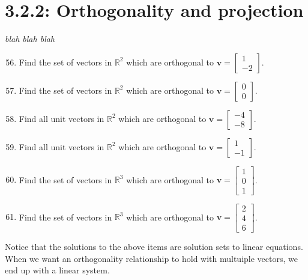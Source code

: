 \documentclass{article}
\begin{document}
\section*{3.2.2: Orthogonality and projection}
\textit{blah blah blah} 
\begin{enumerate}
    \setcounter{enumi}{55}
    \item Find the set of vectors in \(\mathbb{R}^2\) which are orthogonal to \(\mathbf{v} = \begin{bmatrix} 1 \\-2 \end{bmatrix}\).
    \item Find the set of vectors in \(\mathbb{R}^2\) which are orthogonal to \(\mathbf{v} = \begin{bmatrix} 0 \\0 \end{bmatrix}\).
    \item Find all unit vectors in \(\mathbb{R}^2\) which are orthogonal to \(\mathbf{v} = \begin{bmatrix} -4 \\-8 \end{bmatrix}\).
    \item Find all unit vectors in \(\mathbb{R}^2\) which are orthogonal to \(\mathbf{v} = \begin{bmatrix} 1 \\-1 \end{bmatrix}\).
    \item Find the set of vectors in \(\mathbb{R}^3\) which are orthogonal to \(\mathbf{v} = \begin{bmatrix} 1\\0\\1 \end{bmatrix}\).
    \item Find the set of vectors in \(\mathbb{R}^3\) which are orthogonal to \(\mathbf{v} = \begin{bmatrix} 2\\4\\6 \end{bmatrix}\).
\end{enumerate}
\begin{center}
    \colorbox{CornflowerBlue!50}{
    \begin{minipage}[c]{0.9\textwidth}
        \centering
        Notice that the solutions to the above items are solution sets to linear equations. When we want an orthogonality relationship to hold with multuiple vectors, we end up with a linear system. 
    \end{minipage}
    }
\end{center}
\end{document}
